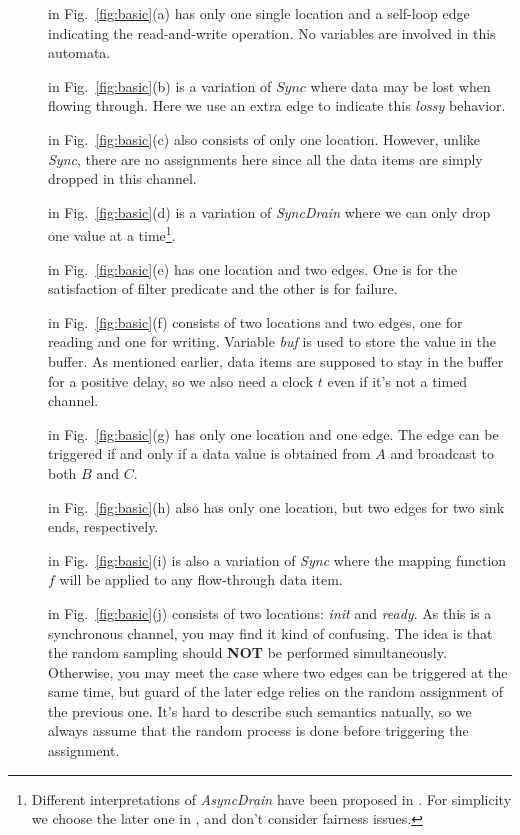\begin{description}
    \item[] in Fig.~\ref{fig:basic}(a) has only one single location and a self-loop edge indicating the read-and-write operation. No variables are involved in this automata.
    \item[] in Fig.~\ref{fig:basic}(b) is a variation of $Sync$ where data may be lost when flowing through. Here we use an extra edge to indicate this \emph{lossy} behavior.
    \item[] in Fig.~\ref{fig:basic}(c) also consists of only one location. However, unlike \emph{Sync}, there are no assignments here since all the data items are simply dropped in this channel.
    \item[] in Fig.~\ref{fig:basic}(d) is a variation of \emph{SyncDrain} where we can only drop one value at a time\footnote{Different interpretations of \emph{AsyncDrain} have been proposed in \cite{ARBAB2004,Baier2006a}. For simplicity we choose the later one in \cite{Baier2006a}, and don't consider fairness issues.}.
    \item[] in Fig.~\ref{fig:basic}(e) has one location and two edges. One is for the satisfaction of filter predicate and the other is for failure.
    \item[] in Fig.~\ref{fig:basic}(f) consists of two locations and two edges, one for reading and one for writing. Variable \emph{buf} is used to store the value in the buffer. As mentioned earlier, data items are supposed to stay in the buffer for a positive delay, so we also need a clock $t$ even if it's not a timed channel.
    \item[] in Fig.~\ref{fig:basic}(g) has only one location and one edge. The edge can be triggered if and only if a data value is obtained from $A$ and broadcast to both $B$ and $C$.
    \item[] in Fig.~\ref{fig:basic}(h) also has only one location, but two edges for two sink ends, respectively.
    \item[] in Fig.~\ref{fig:basic}(i) is also a variation of \emph{Sync} where the mapping function $f$ will be applied to any flow-through data item.
    \item[] in Fig.~\ref{fig:basic}(j) consists of two locations: \emph{init} and \emph{ready}. As this is a synchronous channel, you may find it kind of confusing. The idea is that the random sampling should \textbf{NOT} be performed simultaneously. Otherwise, you may meet the case where two edges can be triggered at the same time, but guard of the later edge relies on the random assignment of the previous one. It's hard to describe such semantics natually, so we always assume that the random process is done before triggering the assignment.



\end{description}
